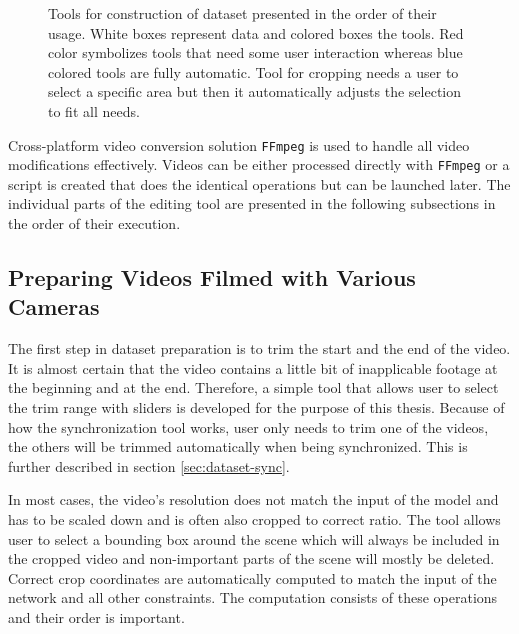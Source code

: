 \begin{figure}[ht!]
    
    \caption{Tools for construction of dataset presented in the order of their usage. White boxes represent data and colored boxes the tools. Red color symbolizes tools that need some user interaction whereas blue colored tools are fully automatic. Tool for cropping needs a user to select a specific area but then it automatically adjusts the selection to fit all needs.}
    \label{fig:dataset-preparation}
\end{figure}

Cross-platform video conversion solution \texttt{FFmpeg} is used to handle all video modifications effectively. Videos can be either processed directly with \texttt{FFmpeg} or a script is created that does the identical operations but can be launched later. The individual parts of the editing tool are presented in the following subsections in the order of their execution.

\subsection{Preparing Videos Filmed with Various Cameras}

The first step in dataset preparation is to trim the start and the end of the video. It is almost certain that the video contains a little bit of inapplicable footage at the beginning and at the end. Therefore, a simple tool that allows user to select the trim range with sliders is developed for the purpose of this thesis. Because of how the synchronization tool works, user only needs to trim one of the videos, the others will be trimmed automatically when being synchronized. This is further described in section \ref{sec:dataset-sync}.

In most cases, the video's resolution does not match the input of the model and has to be scaled down and is often also cropped to correct ratio. The tool allows user to select a bounding box around the scene which will always be included in the cropped video and non-important parts of the scene will mostly be deleted. Correct crop coordinates are automatically computed to match the input of the network and all other constraints. The computation consists of these operations and their order is important.

